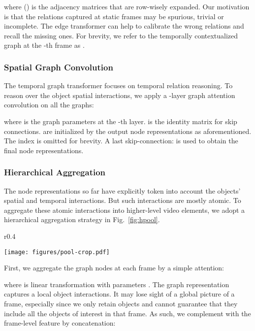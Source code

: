 \documentclass[runningheads]{llncs}
\begin{document}
where  () is the  adjacency matrices that are row-wisely expanded. Our motivation is that the relations captured at static frames may be spurious, trivial or incomplete. The edge transformer can help to calibrate the wrong relations and recall the missing ones. 
For brevity, we refer to the temporally contextualized graph at the -th frame as . 
\vspace{-0.3cm}

\subsubsection{Spatial Graph Convolution}
The temporal graph transformer focuses on temporal relation reasoning. To reason over the object spatial interactions, we apply a -layer graph attention convolution \cite{kipf2016semi} on all the  graphs:

where  is the graph parameters at the -th layer.  is the identity matrix for skip connections.  are initialized by  the output node representations  as aforementioned. The index  is omitted for brevity. A last skip-connection:  is used to obtain the final node representations.

\vspace{-0.3cm}
\subsubsection{Hierarchical Aggregation}
The node representations so far have explicitly token into account the objects' spatial and temporal interactions. But 
such interactions are mostly atomic. To aggregate these
atomic interactions into higher-level
video elements, we adopt a hierarchical aggregation strategy in Fig.~\ref{fig:hpool}. 
\begin{wrapfigure}[7]{r}{0.4\textwidth}
 \vspace{-32pt}
  \begin{center}
    \texttt{[image: figures/pool-crop.pdf]}
  \end{center}
   \vspace{-20pt}
  \caption{Hierarchical Aggregation.}
  \label{fig:hpool}
\end{wrapfigure}
First, we aggregate the graph nodes at each frame by a simple attention:

where  is linear transformation with parameters .
The graph representation  captures a local object interactions. It may lose sight of a global picture of a frame, especially 
since we only retain  objects and cannot guarantee that they include all the objects of interest in that frame. As such, we complement  with the frame-level feature  by concatenation:
\end{document}
